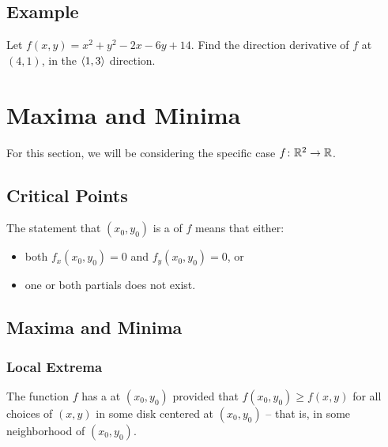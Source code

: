 \subsection{Example}

Let \(f(x,y) = x^{2} + y^{2} - 2x - 6y + 14\). Find the direction derivative of \(f\) at \((4,1)\), in the \(\left\langle 1,3 \right\rangle\) direction. \\


\newpage

\section{Maxima and Minima}

For this section, we will be considering the specific case \(f \colon \mathbb{R}^{2} \to \mathbb{R}\).

\subsection{Critical Points}

The statement that \((x_{0}, y_{0})\) is a  of \(f\) means that either:
\begin{itemize}
    \item both \(f_{x}(x_{0}, y_{0}) = 0\) and \(f_{y}(x_{0}, y_{0}) = 0\), or
    \item one or both partials does not exist.
\end{itemize}

\subsection{Maxima and Minima}

\subsubsection{Local Extrema}

The function \(f\) has a  at \((x_{0}, y_{0})\) provided that \(f(x_{0}, y_{0}) \geq f(x, y)\) for all choices of \((x, y)\) in some disk centered at \((x_{0}, y_{0})\) – that is, in some neighborhood of \((x_{0}, y_{0})\). \\

